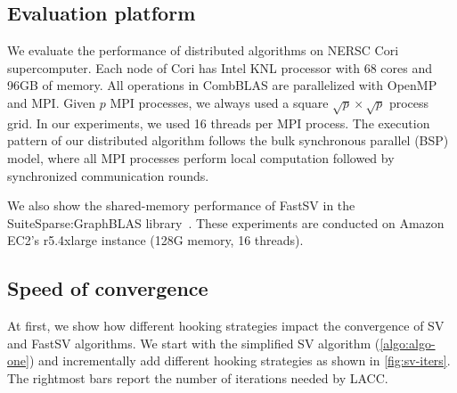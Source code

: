 \documentclass{sokendai_thesis} %
\newcommand{\Name}[0]{FastSV} %
\begin{document}
\subsection{Evaluation platform}
We evaluate the performance of distributed algorithms on NERSC Cori supercomputer.
Each node of Cori has Intel KNL processor with 68 cores and 96GB of memory.
All operations in CombBLAS are parallelized with OpenMP and MPI.
Given $p$ MPI processes, we always used a square $\sqrt{p} \times \sqrt{p}$  process grid.  
In our experiments, we used 16 threads per MPI process. 
The execution pattern of our distributed algorithm follows the bulk synchronous parallel (BSP) model, where all MPI processes perform local computation followed by synchronized communication rounds. 

We also show the shared-memory performance of \Name{} in the SuiteSparse:GraphBLAS library~\cite{suitesparse}.
These experiments are conducted on Amazon EC2's r5.4xlarge instance (128G memory, 16 threads). 



\subsection{Speed of convergence}
\label{sec:convergence}

At first, we show how different hooking strategies impact the convergence of SV and \Name{} algorithms. 
We start with the simplified SV algorithm (\autoref{algo:algo-one}) and incrementally add different hooking  strategies as shown in \autoref{fig:sv-iters}.
The rightmost bars report the number of iterations needed by LACC. %

\end{document}
